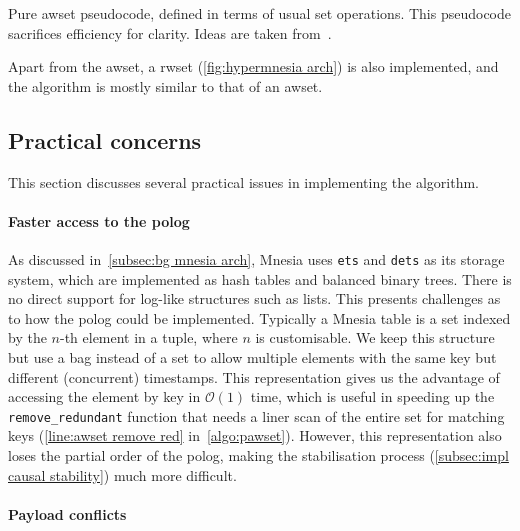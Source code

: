 \begin{algorithm}[htp]
  

  \caption{Pure \acrshort{awset} pseudocode, defined in terms of usual set operations.
  This pseudocode sacrifices efficiency for clarity. Ideas are taken 
  from~\cite{baquero2017PureOp,baquero2014PureOp,bauwens2021Reactivity}.}
  \label{algo:pawset}
\end{algorithm}

Apart from the \acrlong{awset}, a \acrlong{rwset} (\cref{fig:hypermnesia arch}) 
is also implemented, and the algorithm is mostly similar to that of an \acrlong{awset}.

\subsection{Practical concerns} \label{subsec:impl practical}

This section discusses several practical issues in implementing the algorithm.

\paragraph{Faster access to the \acrshort{polog}}

As discussed in~\cref{subsec:bg mnesia arch}, Mnesia uses \texttt{ets} and \texttt{dets}
as its storage system, which are implemented as hash tables and balanced binary trees.
There is no direct support for log-like structures such as lists. This
presents challenges as to how the \acrshort{polog} could be implemented. Typically
a Mnesia table is a set indexed by the \(n\)-th element in a tuple, where \(n\) 
is customisable. We keep this structure but use a bag instead of a set to allow
multiple elements with the same key but different (concurrent) timestamps. 
This representation gives us the advantage of accessing the element by key 
in \(\mathcal O(1)\) time, which is useful in speeding
up the \verb|remove_redundant| function that needs a liner scan of the entire set
for matching keys (\cref{line:awset remove red} in~\cref{algo:pawset}).
However, this representation also loses the partial order of the
\acrshort{polog}, making the stabilisation process (\cref{subsec:impl causal stability}) 
much more difficult. 


\paragraph{Payload conflicts}

